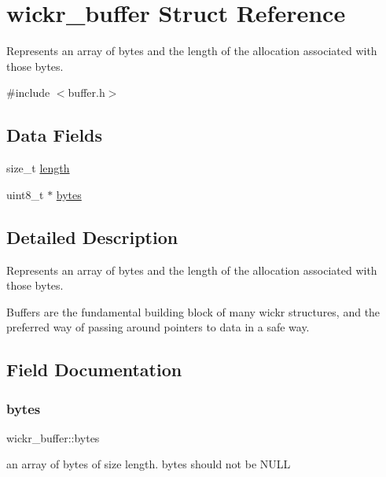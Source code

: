 \hypertarget{structwickr__buffer}{}\section{wickr\+\_\+buffer Struct Reference}
\label{structwickr__buffer}


Represents an array of bytes and the length of the allocation associated with those bytes.  




{\ttfamily \#include $<$buffer.\+h$>$}

\subsection*{Data Fields}
\begin{DoxyCompactItemize}
\item 
size\+\_\+t \mbox{\hyperlink{structwickr__buffer_a8472d93dd98cfe6f98740a42ae16c86b}{length}}
\item 
uint8\+\_\+t $\ast$ \mbox{\hyperlink{structwickr__buffer_a892763a6b3cbe227c4015f948acbc2bf}{bytes}}
\end{DoxyCompactItemize}


\subsection{Detailed Description}
Represents an array of bytes and the length of the allocation associated with those bytes. 

Buffers are the fundamental building block of many wickr structures, and the preferred way of passing around pointers to data in a safe way. 

\subsection{Field Documentation}
\mbox{\label{structwickr__buffer_a892763a6b3cbe227c4015f948acbc2bf}} 
\subsubsection{\texorpdfstring{bytes}{bytes}}
{\footnotesize\ttfamily wickr\+\_\+buffer\+::bytes}

an array of bytes of size length. bytes should not be N\+U\+LL \mbox{\label{structwickr__buffer_a8472d93dd98cfe6f98740a42ae16c86b}} 
